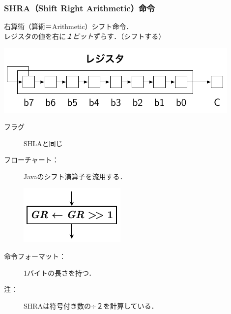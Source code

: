 \documentclass[handout]{beamer}        %
\begin{document}
\begin{frame}
  \frametitle{SHRA（Shift Right Arithmetic）命令}
  右算術（算術＝Arithmetic）シフト命令．\\
  レジスタの値を右に\emph{１ビット}ずらす．（シフトする）
  \vfill
  \centerline{\includegraphics[scale=0.7]{../Tikz/shft2.pdf}}
  \vfill
  \begin{description}
  \item[フラグ] SHLAと同じ
    \vfill
  \item[フローチャート：] Javaのシフト演算子を流用する．\\
    \centerline{\includegraphics[scale=0.7]{../Tikz/shra.pdf}}
    \vfill
  \item[命令フォーマット：] 1バイトの長さを持つ．\\
  \item[注：] SHRAは符号付き数の÷２を計算している．\\
  \end{description}
  \vfill
\end{frame}
\end{document}
